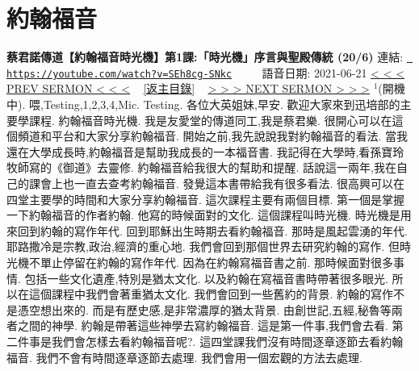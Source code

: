\documentclass{book}
\begin{document}
\section{約翰福音}
\label{sec:SEh8cg_SNkc}
\textbf{蔡君諾傳道【約翰福音時光機】第1課:「時光機」序言與聖殿傳統 (20/6)}
\newline
\newline
連結: \href{https://youtube.com/watch?v=SEh8cg-SNkc}{\texttt{ https://youtube.com/watch?v=SEh8cg-SNkc}} ~~~~ 語音日期: 2021-06-21 
\newline
\newline
\hyperref[sec:LLLLLQ816Zs]{\small{< < < PREV SERMON < < <}}
~
\hyperref[sec:index]{\small{[返主目錄]}}
~
\hyperref[sec:dO8lwORzvRQ]{\small{> > > NEXT SERMON > > >}}
\newline
\newline
$^{1}$(開機中).
喂,Testing,1,2,3,4,Mic.
Testing.
各位大英姐妹,早安.
歡迎大家來到迅培部的主要學課程.
約翰福音時光機.
我是友愛堂的傳道同工,我是蔡君樂.
很開心可以在這個頻道和平台和大家分享約翰福音.
開始之前,我先說說我對約翰福音的看法.
當我還在大學成長時,約翰福音是幫助我成長的一本福音書.
我記得在大學時,看孫寶玲牧師寫的《御道》去靈修.
約翰福音給我很大的幫助和提醒.
話說這一兩年,我在自己的課會上也一直去查考約翰福音.
發覺這本書帶給我有很多看法.
很高興可以在四堂主要學的時間和大家分享約翰福音.
這次課程主要有兩個目標.
第一個是掌握一下約翰福音的作者約翰.
他寫的時候面對的文化.
這個課程叫時光機.
時光機是用來回到約翰的寫作年代.
回到耶穌出生時期去看約翰福音.
那時是風起雲湧的年代.
耶路撒冷是宗教,政治,經濟的重心地.
我們會回到那個世界去研究約翰的寫作.
但時光機不單止停留在約翰的寫作年代.
因為在約翰寫福音書之前.
那時候面對很多事情.
包括一些文化遺產,特別是猶太文化.
以及約翰在寫福音書時帶著很多眼光.
所以在這個課程中我們會著重猶太文化.
我們會回到一些舊約的背景.
約翰的寫作不是憑空想出來的.
而是有歷史感,是非常濃厚的猶太背景.
由創世記,五經,秘魯等兩者之間的神學.
約翰是帶著這些神學去寫約翰福音.
這是第一件事,我們會去看.
第二件事是我們會怎樣去看約翰福音呢?.
這四堂課我們沒有時間逐章逐節去看約翰福音.
我們不會有時間逐章逐節去處理.
我們會用一個宏觀的方法去處理.
\end{document}
